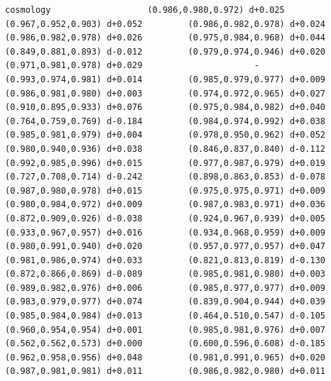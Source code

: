 \documentclass[11pt, letterpaper, openany]{book}
\begin{document}
\begin{empiricalbox}
\begin{lstlisting}[style=terminal]
cosmology                   (0.986,0.980,0.972) d+0.025         (0.967,0.952,0.903) d+0.052         (0.986,0.982,0.978) d+0.024         (0.986,0.982,0.978) d+0.026         (0.975,0.984,0.968) d+0.044         (0.849,0.881,0.893) d-0.012         (0.979,0.974,0.946) d+0.020         (0.971,0.981,0.978) d+0.029                      -                      (0.993,0.974,0.981) d+0.014         (0.985,0.979,0.977) d+0.009         (0.986,0.981,0.980) d+0.003         (0.974,0.972,0.965) d+0.027         (0.910,0.895,0.933) d+0.076         (0.975,0.984,0.982) d+0.040         (0.764,0.759,0.769) d-0.184         (0.984,0.974,0.992) d+0.038         (0.985,0.981,0.979) d+0.004         (0.978,0.950,0.962) d+0.052         (0.980,0.940,0.936) d+0.038         (0.846,0.837,0.840) d-0.112         (0.992,0.985,0.996) d+0.015         (0.977,0.987,0.979) d+0.019         (0.727,0.708,0.714) d-0.242         (0.898,0.863,0.853) d-0.078         (0.987,0.980,0.978) d+0.015         (0.975,0.975,0.971) d+0.009         (0.980,0.984,0.972) d+0.009         (0.987,0.983,0.971) d+0.036         (0.872,0.909,0.926) d-0.038         (0.924,0.967,0.939) d+0.005         (0.933,0.967,0.957) d+0.016         (0.934,0.968,0.959) d+0.009         (0.980,0.991,0.940) d+0.020         (0.957,0.977,0.957) d+0.047         (0.981,0.986,0.974) d+0.033         (0.821,0.813,0.819) d-0.130         (0.872,0.866,0.869) d-0.089         (0.985,0.981,0.980) d+0.003         (0.989,0.982,0.976) d+0.006         (0.985,0.977,0.977) d+0.009         (0.983,0.979,0.977) d+0.074         (0.839,0.904,0.944) d+0.039         (0.985,0.984,0.984) d+0.013         (0.464,0.510,0.547) d-0.105         (0.960,0.954,0.954) d+0.001         (0.985,0.981,0.976) d+0.007         (0.562,0.562,0.573) d+0.000         (0.600,0.596,0.608) d-0.185         (0.962,0.958,0.956) d+0.048         (0.981,0.991,0.965) d+0.020         (0.987,0.981,0.981) d+0.011         (0.986,0.982,0.980) d+0.011     

\end{lstlisting}
\end{empiricalbox}
\end{document}
